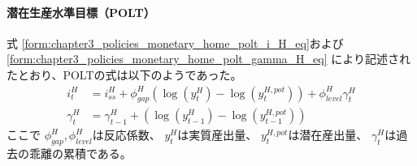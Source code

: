 \paragraph{潜在生産水準目標（POLT）}
\label{sec:chapter5_beta_shock_policies_polt}
式
\eqref{form:chapter3_policies_monetary_home_polt_i_H_eq}および
\eqref{form:chapter3_policies_monetary_home_polt_gamma_H_eq}
により記述されたとおり、POLTの式は以下のようであった。
\begin{align}
\label{form:chapter5_beta_shock_policies_polt_i_H_eq}
    i_t^H&=i_{ss}^H+\phi_{gap}^H(\log(y_t^H)-\log(y_t^{H,pot}))+\phi_{level}^H\gamma_t^H \\
\label{form:chapter5_beta_shock_policies_polt_gamma_H_eq}
    \gamma_t^H&=\gamma_{t-1}^H+(\log(y_{t-1}^H)-\log(y_{t-1}^{H,pot}))
\end{align}
ここで
\(\phi_{gap}^H,\phi_{level}^H\)は反応係数、
\(y_t^H\)は実質産出量、
\(y_t^{H,pot}\)は潜在産出量、
\(\gamma_t^H\)は過去の乖離の累積である。

